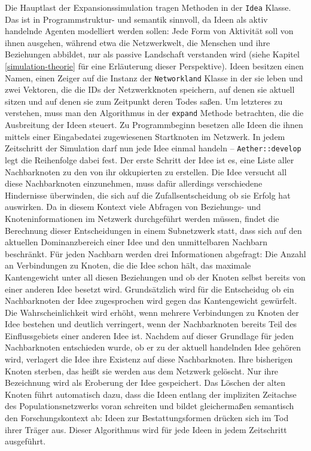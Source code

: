 \documentclass[openany,twoside,twocolumn]{book}
\begin{document}
Die Hauptlast der Expansionssimulation tragen Methoden in der
\texttt{Idea} Klasse. Das ist in Programmstruktur- und semantik
sinnvoll, da Ideen als aktiv handelnde Agenten modelliert werden sollen:
Jede Form von Aktivität soll von ihnen ausgehen, während etwa die
Netzwerkwelt, die Menschen und ihre Beziehungen abbildet, nur als
passive Landschaft verstanden wird (siehe Kapitel
\ref{simulation-theorie} für eine Erläuterung dieser Perspektive). Ideen
besitzen einen Namen, einen Zeiger auf die Instanz der
\texttt{Networkland} Klasse in der sie leben und zwei Vektoren, die die
IDs der Netzwerkknoten speichern, auf denen sie aktuell sitzen und auf
denen sie zum Zeitpunkt deren Todes saßen. Um letzteres zu verstehen,
muss man den Algorithmus in der \texttt{expand} Methode betrachten, die
die Ausbreitung der Ideen steuert. Zu Programmbeginn besetzen alle Ideen
die ihnen mittels einer Eingabedatei zugewiesenen Startknoten im
Netzwerk. In jedem Zeitschritt der Simulation darf nun jede Idee einmal
handeln -- \texttt{Aether::develop} legt die Reihenfolge dabei fest. Der
erste Schritt der Idee ist es, eine Liste aller Nachbarknoten zu den von
ihr okkupierten zu erstellen. Die Idee versucht all diese Nachbarknoten
einzunehmen, muss dafür allerdings verschiedene Hindernisse überwinden,
die sich auf die Zufallsentscheidung ob sie Erfolg hat auswirken. Da in
diesem Kontext viele Abfragen von Beziehungs- und Knoteninformationen im
Netzwerk durchgeführt werden müssen, findet die Berechnung dieser
Entscheidungen in einem Subnetzwerk statt, dass sich auf den aktuellen
Dominanzbereich einer Idee und den unmittelbaren Nachbarn beschränkt.
Für jeden Nachbarn werden drei Informationen abgefragt: Die Anzahl an
Verbindungen zu Knoten, die die Idee schon hält, das maximale
Kantengewicht unter all diesen Beziehungen und ob der Knoten selbst
bereits von einer anderen Idee besetzt wird. Grundsätzlich wird für die
Entscheidug ob ein Nachbarknoten der Idee zugesprochen wird gegen das
Kantengewicht gewürfelt. Die Wahrscheinlichkeit wird erhöht, wenn
mehrere Verbindungen zu Knoten der Idee bestehen und deutlich
verringert, wenn der Nachbarknoten bereits Teil des Einflussgebiets
einer anderen Idee ist. Nachdem auf dieser Grundlage für jeden
Nachbarknoten entschieden wurde, ob er zu der aktuell handelnden Idee
gehören wird, verlagert die Idee ihre Existenz auf diese Nachbarknoten.
Ihre bisherigen Knoten sterben, das heißt sie werden aus dem Netzwerk
gelöscht. Nur ihre Bezeichnung wird als Eroberung der Idee gespeichert.
Das Löschen der alten Knoten führt automatisch dazu, dass die Ideen
entlang der impliziten Zeitachse des Populationsnetzwerks voran
schreiten und bildet gleichermaßen semantisch den Forschungskontext ab:
Ideen zur Bestattungsformen drücken sich im Tod ihrer Träger aus. Dieser
Algorithmus wird für jede Ideen in jedem Zeitschritt ausgeführt.
\end{document}
